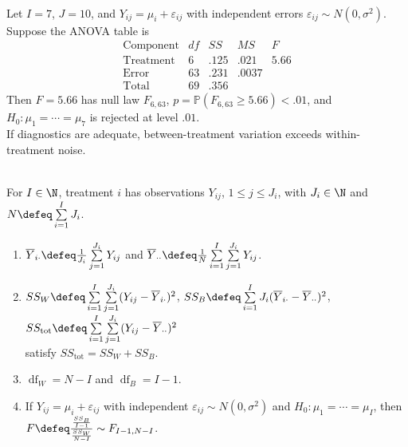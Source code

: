 \begin{example} \label{ex:tablet-laboratories-one-way-anova} \\
Let $I=7$, $J=10$, and $Y_{ij}=\mu_i+\varepsilon_{ij}$ with independent errors $\varepsilon_{ij}\sim N(0,\sigma^2)$. Suppose the ANOVA table is
\[
\begin{array}{c|rrrr}
\text{Component} & df & SS & MS & F\\ \hline
\text{Treatment} & 6 & .125 & .021 & 5.66\\
\text{Error} & 63 & .231 & .0037 & \\
\text{Total} & 69 & .356 & &
\end{array}
\]
Then $F=5.66$ has null law $F_{6,63}$, $p=\mathbb{P}(F_{6,63}\geq5.66)<.01$, and $H_0:\mu_1=\cdots=\mu_7$ is rejected at level $.01$.\\
If diagnostics are adequate, between-treatment variation exceeds within-treatment noise.
\end{example}

\begin{method} \label{meth:one-way-anova-unequal-sample-sizes} \\
For $I\in\N$, treatment $i$ has observations $Y_{ij}$, $1\leq j\leq J_i$, with $J_i\in\N$ and $N\defeq\sum\limits_{i=1}^{I}J_i$.
\begin{enumerate}[label=(\roman*)]
\setlength{\itemsep}{0pt}
\item $\overline{Y}_{i\cdot}\defeq \frac{1}{J_i}\sum\limits_{j=1}^{J_i}Y_{ij}$ and $\overline{Y}_{\cdot\cdot}\defeq \frac{1}{N}\sum\limits_{i=1}^{I}\sum\limits_{j=1}^{J_i}Y_{ij}$.
\item $SS_W\defeq\sum\limits_{i=1}^{I}\sum\limits_{j=1}^{J_i}(Y_{ij}-\overline{Y}_{i\cdot})^2$, $SS_B\defeq\sum\limits_{i=1}^{I}J_i(\overline{Y}_{i\cdot}-\overline{Y}_{\cdot\cdot})^2$, $SS_{\mathrm{tot}}\defeq\sum\limits_{i=1}^{I}\sum\limits_{j=1}^{J_i}(Y_{ij}-\overline{Y}_{\cdot\cdot})^2$\\
satisfy $SS_{\mathrm{tot}}=SS_W+SS_B$.
\item $\operatorname{df}_W=N-I$ and $\operatorname{df}_B=I-1$.
\item If $Y_{ij}=\mu_i+\varepsilon_{ij}$ with independent $\varepsilon_{ij}\sim N(0,\sigma^2)$ and $H_0:\mu_1=\cdots=\mu_I$, then $F\defeq \frac{\frac{SS_B}{I-1}}{\frac{SS_W}{N-I}}\sim F_{I-1,N-I}$.
\end{enumerate}
\end{method}

